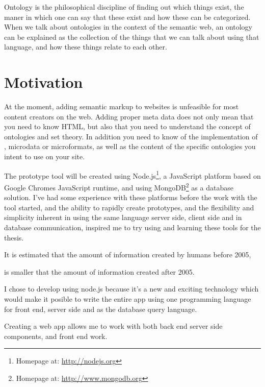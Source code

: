 Ontology is the philosophical discipline of finding out which things exist, 
the maner in which one can say that these exist and how these can be categorized. 
When we talk about ontologies in the context of the semantic web, 
an ontology can be explained as the collection of the things that we can talk about using that language, 
and how these things relate to each other.


\section{Motivation}
At the moment, adding semantic markup to websites is unfeasible for most content creators on the web.
Adding proper meta data does not only mean that you need to know HTML, 
but also that you need to understand the concept of ontologies and set theory. 
In addition you need to know of the implementation of , microdata or microformats, 
as well as the content of the specific ontologies you intent to use on your site.


The prototype tool will be created using Node.js\footnote{Homepage at: \url{http://nodejs.org}}, 
a JavaScript platform based on Google Chromes JavaScript runtime, 
and using MongoDB\footnote{Homepage at: \url{http://www.mongodb.org}} as a database solution.
I've had some experience with these platforms before the work with the tool started, 
and the ability to rapidly create prototypes, and the flexibility and simplicity inherent in using the same language
server side, client side and in database communication, inspired me to try using and learning these tools for the thesis.

It is estimated that the amount of information created by humans before 2005, 

is smaller that the amount of information created after 2005.

I chose to develop using node.js because it's a new and exciting technology which would make it posible to write the entire app using one programming language for front end, 
server side and as the database query language.

Creating a web app allows me to work with both back end server side components, 
and front end work. 

